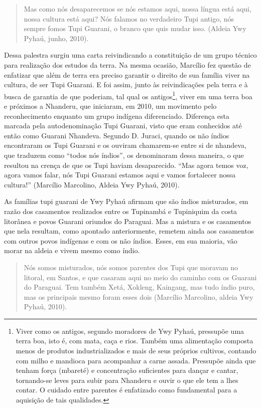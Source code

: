 {{\begin{quotation}
Mas como nós desaparecemos se nós estamos aqui, nossa língua está aqui,
nossa cultura está aqui? Nós falamos no verdadeiro Tupi antigo, nós
sempre fomos Tupi Guarani, o branco que quis mudar isso. (Aldeia Ywy
Pyhaú, junho, 2010).
\end{quotation}

Dessa palestra surgiu uma carta reivindicando a constituição de um grupo
técnico para realização dos estudos da terra. Na mesma ocasião,
Marcílio fez questão de enfatizar que além de terra era preciso
garantir o direito de sua família viver na cultura, de ser Tupi
Guarani. E foi assim, junto às reivindicações pela terra e à busca de
garantia de que poderiam, tal qual os antigos\footnote{Viver como os
antigos, segundo moradores de Ywy Pyhaú, pressupõe uma terra boa, isto
é, com mata, caça e rios. Também uma alimentação composta menos de
produtos industrializados e mais de seus próprios cultivos, contando
com milho e mandioca para acompanhar a carne assada. Pressupõe ainda
que tenham força (mbareté) e concentração suficientes para dançar e
cantar, tornando-se leves para subir para Nhanderu  e ouvir o que ele
tem a lhes contar. O cuidado entre parentes é enfatizado como
fundamental para a aquisição de tais qualidades.}, viver em uma terra
boa e próximos a Nhanderu, que iniciaram, em 2010, um movimento pelo
reconhecimento enquanto um grupo indígena diferenciado. Diferença esta
marcada pela autodenominação Tupi Guarani, visto que eram conhecidos
até então como Guarani Nhandeva. Segundo D. Juraci, quando os não
índios encontraram os Tupi Guarani e os ouviram chamarem-se entre si de
nhandeva, que traduzem como ``todos nós índios'', os denominaram dessa
maneira, o que resultou na crença de que os Tupi haviam desaparecido.
``Mas agora temos voz, agora vamos falar, nós Tupi Guarani estamos aqui
e vamos fortalecer nossa cultura!'' (Marcílio Marcolino, Aldeia Ywy
Pyhaú, 2010).

As famílias tupi guarani de Ywy Pyhaú afirmam que são índios misturados,
em razão dos casamentos realizados entre os Tupinambá e Tupiniquim da
costa litorânea e povos Guarani oriundos do Paraguai. Mas a mistura e
os casamentos que nela resultam, como apontado anteriormente, remetem
ainda aos casamentos com outros povos indígenas e com os não índios.
Esses, em sua maioria, vão morar na aldeia e vivem mesmo como índio.

\begin{quotation}
Nós somos misturados, nós somos parentes dos Tupi que moravam no
litoral, em Santos, e que casaram aqui no meio do caminho com os
Guarani do Paraguai. Tem também Xetá, Xokleng, Kaingang, mas tudo índio
puro, mas os principais mesmo foram esses dois (Marcílio Marcolino,
aldeia Ywy Pyhaú, 2010).
\end{quotation}

}}
